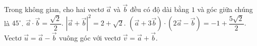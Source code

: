 \begin{ex}
Trong không gian, cho hai vectơ $\vec{a}$ và $\vec{b}$ đều có độ dài bằng $1$ và góc giữa chúng là $45^\circ$.
\choiceTF
{\True $\vec{a}\cdot\vec{b}=\dfrac{\sqrt2}2$.}
{\True $|\vec{a}+\vec{b}|^2=2+\sqrt2$.}
{\True $(\vec{a}+3\vec{b})\cdot(2\vec{a}-\vec{b})=-1+\dfrac{5\sqrt2}2$.}
{\True Vectơ $\vec{u}=\vec{a}-\vec{b}$ vuông góc với vectơ $\vec{v}=\vec{a}+\vec{b}$.}
\end{ex}
